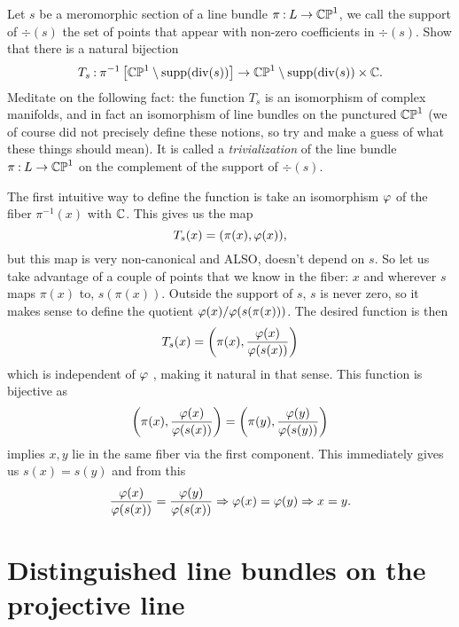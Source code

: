 \documentclass[12pt]{memoir}
\begin{document}
\begin{Ej}
    Let $s$ be a meromorphic section of a line bundle $\pi\mathbin{:} L\to\mathbb{CP}^1$, we call the support of $\div(s)$ the set of points that appear with non-zero coefficients in $\div(s)$. Show that there is a natural bijection 
    $$T_s\mathbin{:}\pi^{-1}\left\lbrack\mathbb{CP}^1\setminus\operatorname{supp}(\operatorname{div}(s))\right\rbrack\to\mathbb{CP}^1\setminus\operatorname{supp}(\operatorname{div}(s))\times\mathbb{C}.$$
Meditate on the following fact: the function $T_s$ 
 is an isomorphism of complex manifolds, and in fact an isomorphism of line bundles on the punctured $\mathbb{CP}^1$
 (we of course did not precisely define these notions, so try and make a guess of what these things should mean). It is called a \emph{trivialization}  of the line bundle $\pi\mathbin{:} L\to\mathbb{CP}^1$
 on the complement of the support of $\div(s)$.
\end{Ej}

\begin{ptcbr}
    The first intuitive way to define the function is take an isomorphism $\varphi$ of the fiber $\pi^{-1}(x)$ with $\mathbb{C}$. This gives us the map 
    $$T_s(x)=(\pi(x),\varphi(x)),$$
    but this map is very non-canonical and ALSO, doesn't depend on $s$. So let us take advantage of a couple of points that we know in the fiber: $x$ and wherever $s$ maps $\pi(x)$ to, $s(\pi(x))$. Outside the support of $s$, $s$ is never zero, so it makes sense to define the quotient $\varphi(x)/\varphi(s(\pi(x)))$. The desired function is then 
    $$T_s(x)=\left(\pi(x),\frac{\varphi(x)}{\varphi(s(x))}\right)$$
    which is independent of $\varphi$ , making it natural in that sense. This function is bijective as 
    $$\left(\pi(x),\frac{\varphi(x)}{\varphi(s(x))}\right)=\left(\pi(y),\frac{\varphi(y)}{\varphi(s(y))}\right)$$
    implies $x,y$ lie in the same fiber via the first component. This immediately gives us $s(x)=s(y)$ and from this 
    $$\frac{\varphi(x)}{\varphi(s(x))}=\frac{\varphi(y)}{\varphi(s(x))}\Rightarrow \varphi(x)=\varphi(y)\Rightarrow x=y.$$
\end{ptcbr}

\section{Distinguished line bundles on the projective line}
\end{document}
